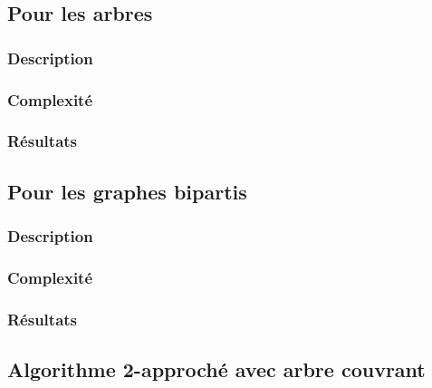 \documentclass[a4paper,10pt]{article}
\begin{document}
\subsection{Pour les arbres}

\subsubsection{Description}


\subsubsection{Complexité}


\subsubsection{Résultats}


\subsection{Pour les graphes bipartis}

\subsubsection{Description}

\subsubsection{Complexité}

\subsubsection{Résultats}


\subsection{Algorithme 2-approché avec arbre couvrant}
\end{document}
